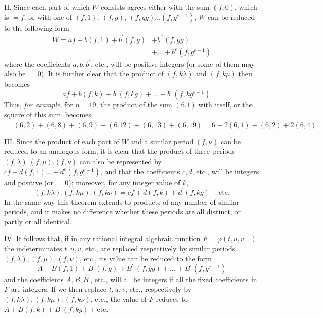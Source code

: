 II. Since each part of which \(W\) consists agrees either with the sum \((f,\allowbreak 0)\), which is \(=f\), or with one of \((f,\allowbreak 1),\allowbreak \ (f,\allowbreak g),\allowbreak \ (f,\allowbreak gg)\ldots(f,\allowbreak g^{e-1})\), \(W\) can be reduced to the following form \[\begin{aligned}
W=af+b(f,1)+b^{\prime}(f,g)&+b^{\prime\prime}(f,gg)\\
&+\ldots+b^\varepsilon(f,g^{e-1})
\end{aligned}\] where the coefficients \(a,\allowbreak b,\allowbreak b^{\prime}\), etc., will be positive integers (or some of them may also be \(=0\)). It is further clear that the product of \((f,\allowbreak k\lambda)\) and \((f,\allowbreak k\mu)\) then becomes \[=af+b(f,k)+b^{\prime}(f,kg)+\ldots+b^\varepsilon(f,kg^{e-1})\] Thus, \textit{for example}, for \(n=19\), the product of the sum \((6.1)\) with itself, or the square of this sum, becomes \(=(6,\allowbreak 2)+(6,\allowbreak 8)+(6,\allowbreak 9)+(6.12)+(6,\allowbreak 13)+(6,\allowbreak 19)=6+2(6,\allowbreak 1)+(6,\allowbreak 2)+2(6,\allowbreak 4).\)

III. Since the product of each part of \(W\) and a similar period \((f,\allowbreak \nu)\) can be reduced to an analogous form, it is clear that the product of three periods \((f,\allowbreak \lambda).(f,\allowbreak \mu).(f,\allowbreak \nu)\) can also be represented by \(cf+d(f,\allowbreak 1)\ldots+d^\varepsilon(f,\allowbreak g^{e-1})\), and that the coefficients \(c,\allowbreak d\), etc., will be integers and positive (or \(=0\)); moreover, for any integer value of \(k\), \[(f,k\lambda).(f,k\mu).(f,k\nu)=cf+d(f,k)+d^{\prime}(f,kg)+\text{etc.}\] In the same way this theorem extends to products of any number of similar periods, and it makes no difference whether these periods are all distinct, or partly or all identical.

IV. It follows that, if in any rational integral algebraic function \(F=\varphi(t,\allowbreak u,\allowbreak v\ldots)\) the indeterminates \(t,\allowbreak u,\allowbreak v\), etc., are replaced respectively by similar periods \((f,\allowbreak \lambda),\allowbreak (f,\allowbreak \mu),\allowbreak (f,\allowbreak \nu)\), etc., its value can be reduced to the form \[A+B(f,1)+B^{\prime}(f,g)+B^{\prime\prime}(f,gg)+\ldots+B^\varepsilon(f,g^{e-1})\] and the coefficients \(A,\allowbreak B,\allowbreak B^{\prime}\), etc., will all be integers if all the fixed coefficients in \(F\) are integers. If we then replace \(t,\allowbreak u,\allowbreak v\), etc., respectively
by \((f,\allowbreak k\lambda),\allowbreak (f,\allowbreak k\mu),\allowbreak (f,\allowbreak k\nu)\), etc., the value of \(F\) reduces to \(A+B(f,\allowbreak k)+B^{\prime}(f,\allowbreak kg)+\text{etc.}\)

